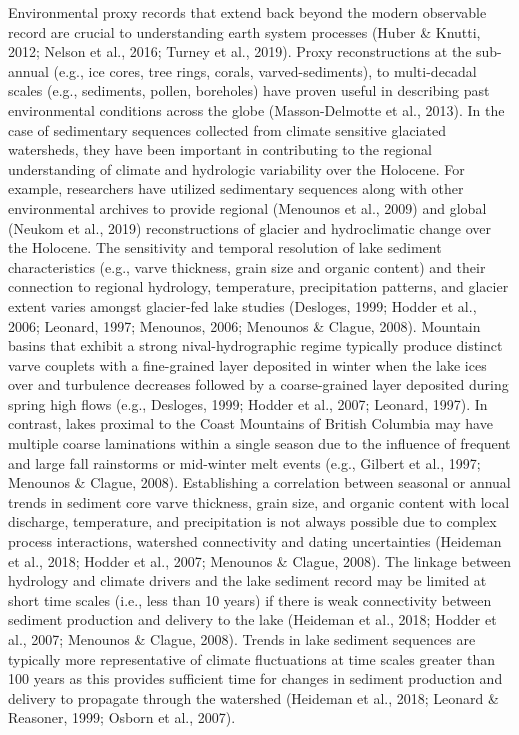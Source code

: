 \documentclass[
  letterpaper,
  DIV=11,
  numbers=noendperiod]{scrartcl}
\begin{document}
Environmental proxy records that extend back beyond the modern
observable record are crucial to understanding earth system processes
(Huber \& Knutti, 2012; Nelson et al., 2016; Turney et al., 2019). Proxy
reconstructions at the sub-annual (e.g., ice cores, tree rings, corals,
varved-sediments), to multi-decadal scales (e.g., sediments, pollen,
boreholes) have proven useful in describing past environmental
conditions across the globe (Masson-Delmotte et al., 2013). In the case
of sedimentary sequences collected from climate sensitive glaciated
watersheds, they have been important in contributing to the regional
understanding of climate and hydrologic variability over the Holocene.
For example, researchers have utilized sedimentary sequences along with
other environmental archives to provide regional (Menounos et al., 2009)
and global (Neukom et al., 2019) reconstructions of glacier and
hydroclimatic change over the Holocene. The sensitivity and temporal
resolution of lake sediment characteristics (e.g., varve thickness,
grain size and organic content) and their connection to regional
hydrology, temperature, precipitation patterns, and glacier extent
varies amongst glacier-fed lake studies (Desloges, 1999; Hodder et al.,
2006; Leonard, 1997; Menounos, 2006; Menounos \& Clague, 2008). Mountain
basins that exhibit a strong nival-hydrographic regime typically produce
distinct varve couplets with a fine-grained layer deposited in winter
when the lake ices over and turbulence decreases followed by a
coarse-grained layer deposited during spring high flows (e.g., Desloges,
1999; Hodder et al., 2007; Leonard, 1997). In contrast, lakes proximal
to the Coast Mountains of British Columbia may have multiple coarse
laminations within a single season due to the influence of frequent and
large fall rainstorms or mid-winter melt events (e.g., Gilbert et al.,
1997; Menounos \& Clague, 2008). Establishing a correlation between
seasonal or annual trends in sediment core varve thickness, grain size,
and organic content with local discharge, temperature, and precipitation
is not always possible due to complex process interactions, watershed
connectivity and dating uncertainties (Heideman et al., 2018; Hodder et
al., 2007; Menounos \& Clague, 2008). The linkage between hydrology and
climate drivers and the lake sediment record may be limited at short
time scales (i.e., less than 10 years) if there is weak connectivity
between sediment production and delivery to the lake (Heideman et al.,
2018; Hodder et al., 2007; Menounos \& Clague, 2008). Trends in lake
sediment sequences are typically more representative of climate
fluctuations at time scales greater than 100 years as this provides
sufficient time for changes in sediment production and delivery to
propagate through the watershed (Heideman et al., 2018; Leonard \&
Reasoner, 1999; Osborn et al., 2007).
\end{document}

